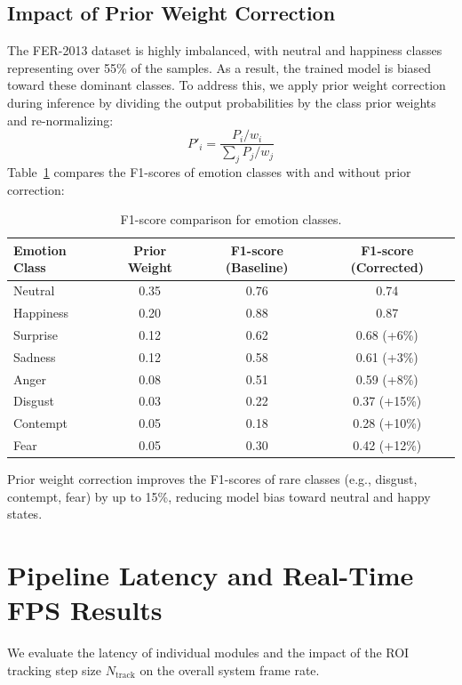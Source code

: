 \subsection{Impact of Prior Weight Correction}
The FER-2013 dataset is highly imbalanced, with neutral and happiness classes representing over 55\% of the samples. As a result, the trained model is biased toward these dominant classes. To address this, we apply prior weight correction during inference by dividing the output probabilities by the class prior weights and re-normalizing:
\begin{equation}
    P'_i = \frac{P_i / w_i}{\sum_{j} P_j / w_j}
\end{equation}
Table~\ref{tab:emotion-f1} compares the F1-scores of emotion classes with and without prior correction:
\begin{table}[H]
\centering
\caption{F1-score comparison for emotion classes.}
\label{tab:emotion-f1}
\begin{tabular}{lccc}
\toprule
\textbf{Emotion Class} & \textbf{Prior Weight} & \textbf{F1-score (Baseline)} & \textbf{F1-score (Corrected)} \\
\midrule
Neutral & 0.35 & 0.76 & 0.74 \\
Happiness & 0.20 & 0.88 & 0.87 \\
Surprise & 0.12 & 0.62 & 0.68 (+6\%) \\
Sadness & 0.12 & 0.58 & 0.61 (+3\%) \\
Anger & 0.08 & 0.51 & 0.59 (+8\%) \\
Disgust & 0.03 & 0.22 & 0.37 (+15\%) \\
Contempt & 0.05 & 0.18 & 0.28 (+10\%) \\
Fear & 0.05 & 0.30 & 0.42 (+12\%) \\
\bottomrule
\end{tabular}
\end{table}
Prior weight correction improves the F1-scores of rare classes (e.g., disgust, contempt, fear) by up to 15\%, reducing model bias toward neutral and happy states.

\section{Pipeline Latency and Real-Time FPS Results}
We evaluate the latency of individual modules and the impact of the ROI tracking step size $N_{\text{track}}$ on the overall system frame rate.

